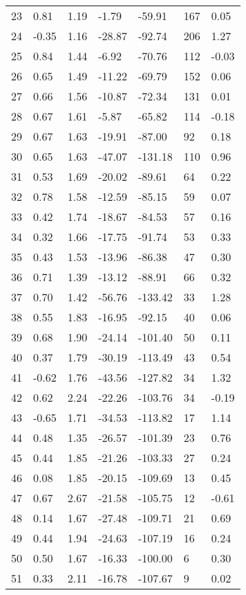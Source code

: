 \begin{appendices}
\begin{longtable}[c]{@{}lllllll@{}}
23 & 0.81 & 1.19 & -1.79 & -59.91 & 167 & 0.05 \\
24 & -0.35 & 1.16 & -28.87 & -92.74 & 206 & 1.27 \\
25 & 0.84 & 1.44 & -6.92 & -70.76 & 112 & -0.03 \\
26 & 0.65 & 1.49 & -11.22 & -69.79 & 152 & 0.06 \\
27 & 0.66 & 1.56 & -10.87 & -72.34 & 131 & 0.01 \\
28 & 0.67 & 1.61 & -5.87 & -65.82 & 114 & -0.18 \\
29 & 0.67 & 1.63 & -19.91 & -87.00 & 92 & 0.18 \\
30 & 0.65 & 1.63 & -47.07 & -131.18 & 110 & 0.96 \\
31 & 0.53 & 1.69 & -20.02 & -89.61 & 64 & 0.22 \\
32 & 0.78 & 1.58 & -12.59 & -85.15 & 59 & 0.07 \\
33 & 0.42 & 1.74 & -18.67 & -84.53 & 57 & 0.16 \\
34 & 0.32 & 1.66 & -17.75 & -91.74 & 53 & 0.33 \\
35 & 0.43 & 1.53 & -13.96 & -86.38 & 47 & 0.30 \\
36 & 0.71 & 1.39 & -13.12 & -88.91 & 66 & 0.32 \\
37 & 0.70 & 1.42 & -56.76 & -133.42 & 33 & 1.28 \\
38 & 0.55 & 1.83 & -16.95 & -92.15 & 40 & 0.06 \\
39 & 0.68 & 1.90 & -24.14 & -101.40 & 50 & 0.11 \\
40 & 0.37 & 1.79 & -30.19 & -113.49 & 43 & 0.54 \\
41 & -0.62 & 1.76 & -43.56 & -127.82 & 34 & 1.32 \\
42 & 0.62 & 2.24 & -22.26 & -103.76 & 34 & -0.19 \\
43 & -0.65 & 1.71 & -34.53 & -113.82 & 17 & 1.14 \\
44 & 0.48 & 1.35 & -26.57 & -101.39 & 23 & 0.76 \\
45 & 0.44 & 1.85 & -21.26 & -103.33 & 27 & 0.24 \\
46 & 0.08 & 1.85 & -20.15 & -109.69 & 13 & 0.45 \\
47 & 0.67 & 2.67 & -21.58 & -105.75 & 12 & -0.61 \\
48 & 0.14 & 1.67 & -27.48 & -109.71 & 21 & 0.69 \\
49 & 0.44 & 1.94 & -24.63 & -107.19 & 16 & 0.24 \\
50 & 0.50 & 1.67 & -16.33 & -100.00 & 6 & 0.30 \\
51 & 0.33 & 2.11 & -16.78 & -107.67 & 9 & 0.02 \\

\end{longtable}
\end{appendices}
